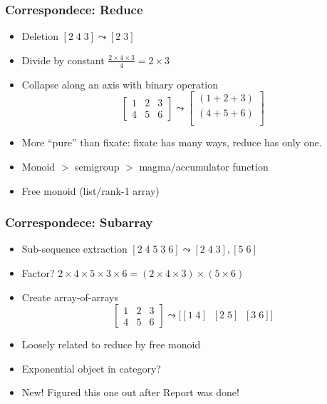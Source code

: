 \documentclass[xetex,mathserif,serif]{beamer}
\begin{document}
\begin{frame}
  \frametitle{Correspondece: Reduce}
  \begin{itemize}%
    \item Deletion \([2\;4\;3] \leadsto [2\;3]\)
    \item Divide by constant \(\frac{2\times4\times3}4 = 2\times3\)
    \item Collapse along an axis with binary operation
      \[
        \begin{bmatrix}
          1 & 2 & 3 \\
          4 & 5 & 6
        \end{bmatrix} \leadsto
        \begin{bmatrix}
          (1 + 2 + 3) \\
          (4 + 5 + 6) \\
        \end{bmatrix}
      \]
    \item More ``pure'' than fixate: fixate has many ways,
      reduce has only one.
    \item Monoid $>$ semigroup $>$ magma/accumulator function
    \item Free monoid (list/rank-1 array)
  \end{itemize}
\end{frame}

\begin{frame}
  \frametitle{Correspondece: Subarray}
  \begin{itemize}%
    \item Sub-sequence extraction \([2\;4\;5\;3\;6] \leadsto [2\;4\;3], [5\;6]\)
    \item Factor? \(2\times4\times5\times3\times6 = (2\times4\times3)\times(5\times6)\)
    \item Create array-of-arrays
      \[
        \begin{bmatrix}
          1 & 2 & 3 \\
          4 & 5 & 6
        \end{bmatrix} \leadsto \big[[1\;4]\;\;[2\;5]\;\;[3\;6]\big]
      \]
    \item Loosely related to reduce by free monoid
    \item Exponential object in category?
    \item New! Figured this one out after Report was done!
  \end{itemize}
\end{frame}
\end{document}
